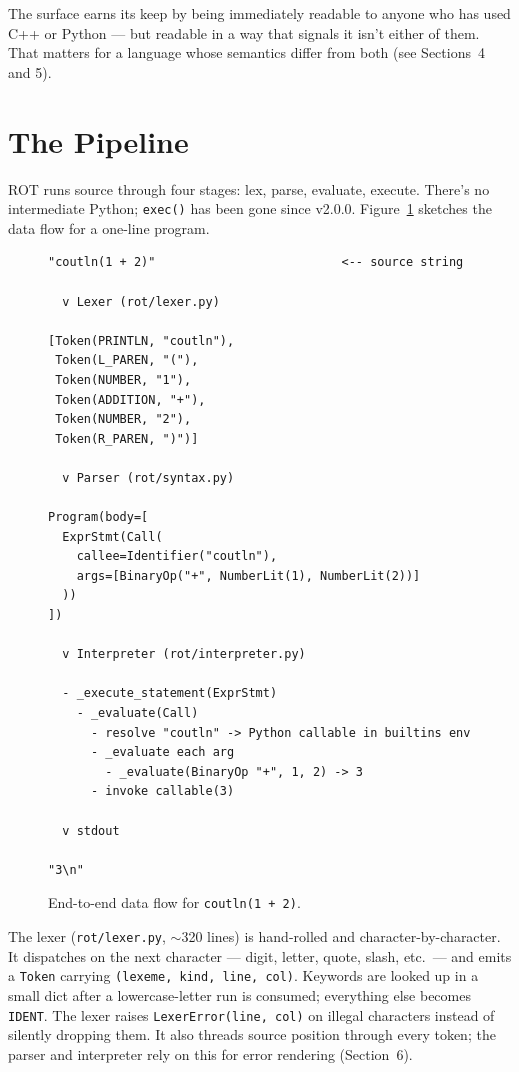 \documentclass[11pt]{article}
\begin{document}
The surface earns its keep by being immediately readable to anyone who has used C++ or Python --- but readable in a way that signals it isn't either of them. That matters for a language whose semantics differ from both (see Sections~4 and 5).

\section{The Pipeline}

ROT runs source through four stages: lex, parse, evaluate, execute. There's no intermediate Python; \texttt{exec()} has been gone since v2.0.0. Figure~\ref{fig:pipeline} sketches the data flow for a one-line program.

\begin{figure}[h!]
\centering
\begin{lstlisting}[style=plainstyle, frame=none, basicstyle=\ttfamily\footnotesize]
"coutln(1 + 2)"                          <-- source string

  v Lexer (rot/lexer.py)

[Token(PRINTLN, "coutln"),
 Token(L_PAREN, "("),
 Token(NUMBER, "1"),
 Token(ADDITION, "+"),
 Token(NUMBER, "2"),
 Token(R_PAREN, ")")]

  v Parser (rot/syntax.py)

Program(body=[
  ExprStmt(Call(
    callee=Identifier("coutln"),
    args=[BinaryOp("+", NumberLit(1), NumberLit(2))]
  ))
])

  v Interpreter (rot/interpreter.py)

  - _execute_statement(ExprStmt)
    - _evaluate(Call)
      - resolve "coutln" -> Python callable in builtins env
      - _evaluate each arg
        - _evaluate(BinaryOp "+", 1, 2) -> 3
      - invoke callable(3)

  v stdout

"3\n"
\end{lstlisting}
\caption{End-to-end data flow for \texttt{coutln(1 + 2)}.}
\label{fig:pipeline}
\end{figure}

The lexer (\texttt{rot/lexer.py}, $\sim$320 lines) is hand-rolled and character-by-character. It dispatches on the next character --- digit, letter, quote, slash, etc.\ --- and emits a \texttt{Token} carrying \texttt{(lexeme, kind, line, col)}. Keywords are looked up in a small dict after a lowercase-letter run is consumed; everything else becomes \texttt{IDENT}. The lexer raises \texttt{LexerError(line, col)} on illegal characters instead of silently dropping them. It also threads source position through every token; the parser and interpreter rely on this for error rendering (Section~6).
\end{document}
